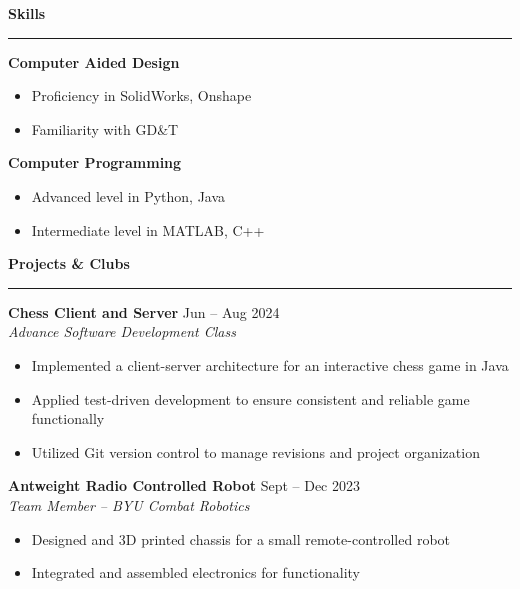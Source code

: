 \documentclass[a4paper,10pt]{article}
\newcommand{\sectionline}{\noindent\rule{\linewidth}{0.5pt}\vspace{-0.5em}}
\begin{document}
\textbf{Skills} \vspace{-1em}\\
\sectionline
\vspace{-0.5em}
\begin{multicols}{2}
    \textbf{Computer Aided Design}
    \begin{itemize}[noitemsep, topsep=0pt]
        \item Proficiency in SolidWorks, Onshape
        \item Familiarity with GD\&T
    \end{itemize}

    \columnbreak

    \textbf{Computer Programming}
    \begin{itemize}[noitemsep, topsep=0pt]
        \item Advanced level in Python, Java
        \item Intermediate level in MATLAB, C++
    \end{itemize}
\end{multicols}
\vspace{-1em}

\textbf{Projects \& Clubs} \vspace{-1em}\\
\sectionline

\textbf{Chess Client and Server} \hfill Jun -- Aug 2024 \\
\emph{Advance Software Development Class}
\begin{itemize}[noitemsep, topsep=0pt]
    \item Implemented a client-server architecture for an interactive chess game in Java
    \item Applied test-driven development to ensure consistent and reliable game functionally
    \item Utilized Git version control to manage revisions and project organization 
\end{itemize}

\textbf{Antweight Radio Controlled Robot} \hfill Sept -- Dec 2023 \\
\emph{Team Member -- BYU Combat Robotics}
\begin{itemize}[noitemsep, topsep=0pt]
    \item Designed and 3D printed chassis for a small remote-controlled robot
    \item Integrated and assembled electronics for functionality
\end{itemize}
\end{document}
